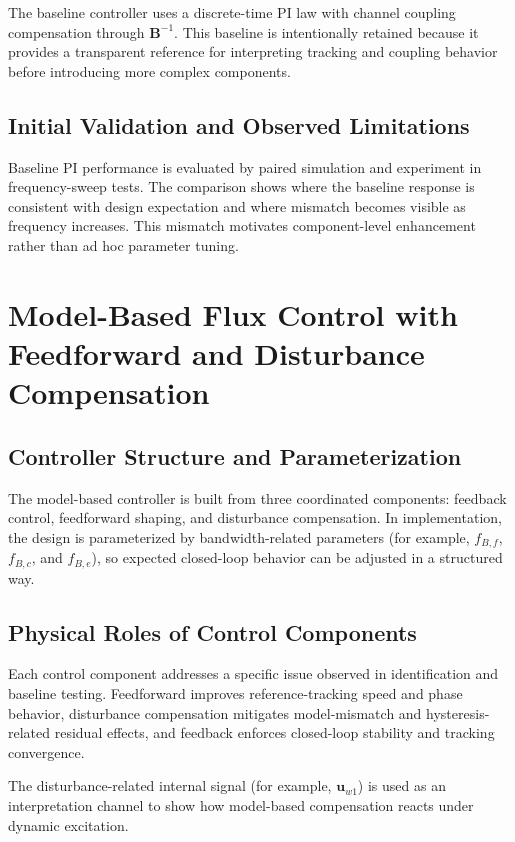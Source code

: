 The baseline controller uses a discrete-time PI law with channel coupling compensation through $\mathbf{B}^{-1}$. This baseline is intentionally retained because it provides a transparent reference for interpreting tracking and coupling behavior before introducing more complex components.

\subsection{Initial Validation and Observed Limitations}

Baseline PI performance is evaluated by paired simulation and experiment in frequency-sweep tests. The comparison shows where the baseline response is consistent with design expectation and where mismatch becomes visible as frequency increases. This mismatch motivates component-level enhancement rather than ad hoc parameter tuning.

\section{Model-Based Flux Control with Feedforward and Disturbance Compensation}

\subsection{Controller Structure and Parameterization}

The model-based controller is built from three coordinated components: feedback control, feedforward shaping, and disturbance compensation. In implementation, the design is parameterized by bandwidth-related parameters (for example, $f_{B,f}$, $f_{B,c}$, and $f_{B,e}$), so expected closed-loop behavior can be adjusted in a structured way.

\subsection{Physical Roles of Control Components}

Each control component addresses a specific issue observed in identification and baseline testing. Feedforward improves reference-tracking speed and phase behavior, disturbance compensation mitigates model-mismatch and hysteresis-related residual effects, and feedback enforces closed-loop stability and tracking convergence.

The disturbance-related internal signal (for example, $\mathbf{u}_{w1}$) is used as an interpretation channel to show how model-based compensation reacts under dynamic excitation.

